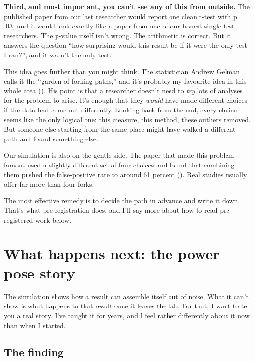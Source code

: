 \documentclass[
]{book}
\begin{document}
\textbf{Third, and most important, you can't see any of this from outside.} The published paper from our last researcher would report one clean t-test with p = .03, and it would look exactly like a paper from one of our honest single-test researchers. The p-value itself isn't wrong. The arithmetic is correct. But it answers the question ``how surprising would this result be if it were the only test I ran?'', and it wasn't the only test.

This idea goes further than you might think. The statistician Andrew Gelman calls it the ``garden of forking paths,'' and it's probably my favourite idea in this whole area (). His point is that a researcher doesn't need to \emph{try} lots of analyses for the problem to arise. It's enough that they \emph{would} have made different choices if the data had come out differently. Looking back from the end, every choice seems like the only logical one: this measure, this method, these outliers removed. But someone else starting from the same place might have walked a different path and found something else.

Our simulation is also on the gentle side. The paper that made this problem famous used a slightly different set of four choices and found that combining them pushed the false-positive rate to around 61 percent (). Real studies usually offer far more than four forks.

The most effective remedy is to decide the path in advance and write it down. That's what pre-registration does, and I'll say more about how to read pre-registered work below.

\section{What happens next: the power pose story}\label{power-pose}

The simulation shows how a result can assemble itself out of noise. What it can't show is what happens to that result once it leaves the lab. For that, I want to tell you a real story. I've taught it for years, and I feel rather differently about it now than when I started.

\subsection{The finding}\label{the-finding}
\end{document}

